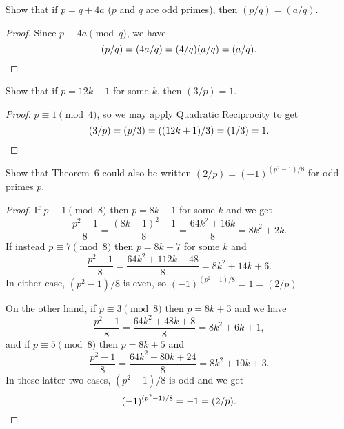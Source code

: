  Show that if $p = q + 4a$ ($p$ and $q$ are odd primes),
then $(p/q) = (a/q)$.
\begin{proof}
  Since $p\equiv4a\pmod{q}$, we have
  \begin{equation*}
    (p/q) = (4a/q) = (4/q)(a/q) = (a/q). \qedhere
  \end{equation*}
\end{proof}

 Show that if $p = 12k + 1$ for some $k$, then
$(3/p) = 1$.
\begin{proof}
  $p\equiv1\pmod4$, so we may apply Quadratic Reciprocity to get
  \begin{equation*}
    (3/p) = (p/3) = ((12k+1)/3) = (1/3) = 1. \qedhere
  \end{equation*}
\end{proof}

 Show that Theorem~6 could also be written
$(2/p) = (-1)^{(p^2-1)/8}$ for odd primes $p$.
\begin{proof}
  If $p\equiv1\pmod8$ then $p = 8k + 1$ for some $k$ and we get
  \begin{equation*}
    \frac{p^2 - 1}8 = \frac{(8k + 1)^2 - 1}8
    = \frac{64k^2 + 16k}8 = 8k^2 + 2k.
  \end{equation*}
  If instead $p\equiv7\pmod8$ then $p = 8k + 7$ for some
  $k$ and
  \begin{equation*}
    \frac{p^2 - 1}8 = \frac{64k^2 + 112k + 48}8
    = 8k^2 + 14k + 6.
  \end{equation*}
  In either case, $(p^2 - 1)/8$ is even, so
  $(-1)^{(p^2-1)/8} = 1 = (2/p)$.

  On the other hand, if $p\equiv3\pmod8$ then $p = 8k + 3$ and we have
  \begin{equation*}
    \frac{p^2 - 1}8 = \frac{64k^2 + 48k + 8}8 = 8k^2 + 6k + 1,
  \end{equation*}
  and if $p\equiv5\pmod8$ then $p = 8k + 5$ and
  \begin{equation*}
    \frac{p^2 - 1}8 = \frac{64k^2 + 80k + 24}8 = 8k^2 + 10k + 3.
  \end{equation*}
  In these latter two cases, $(p^2 - 1)/8$ is odd and we get
  \begin{equation*}
    (-1)^{(p^2-1)/8} = -1 = (2/p).\qedhere
  \end{equation*}
\end{proof}


